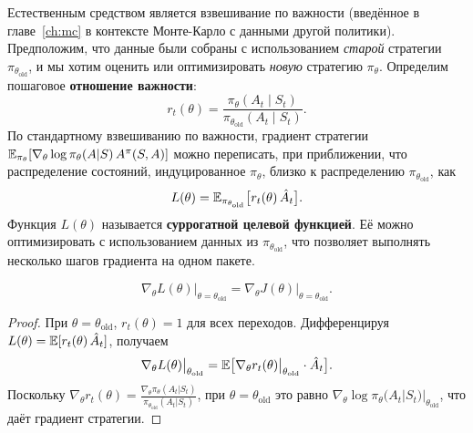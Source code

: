 Естественным средством является взвешивание по важности (введённое в главе~\ref{ch:mc} в контексте Монте-Карло с данными другой политики). Предположим, что данные были собраны с использованием \emph{старой} стратегии $\pi_{\theta_\mathrm{old}}$, и мы хотим оценить или оптимизировать \emph{новую} стратегию $\pi_\theta$. Определим пошаговое \textbf{отношение важности}:
\begin{equation}
\label{eq:importance-ratio}
r_t(\theta)
= \frac{\pi_\theta(A_t \mid S_t)}{\pi_{\theta_\mathrm{old}}(A_t \mid S_t)}.
\end{equation}
По стандартному взвешиванию по важности, градиент стратегии $\operatorname{\mathbb{E}}_{\pi_\theta}[\nabla_\theta \log\pi_\theta(A|S)\,A^\pi(S,A)]$ можно переписать, при приближении, что распределение состояний, индуцированное $\pi_\theta$, близко к распределению $\pi_{\theta_\mathrm{old}}$, как
\begin{equation}
\label{eq:surrogate-obj}
L(\theta) = \operatorname{\mathbb{E}}_{\pi_{\theta_\mathrm{old}}}\bigl[r_t(\theta)\,\hat{A}_t\bigr].
\end{equation}
Функция $L(\theta)$ называется \textbf{суррогатной целевой функцией}.
Её можно оптимизировать с использованием данных из $\pi_{\theta_\mathrm{old}}$, что позволяет выполнять несколько шагов градиента на одном пакете.

\begin{proposition}
\label{prop:surrogate-gradient}
\begin{equation}
\label{eq:surrogate-gradient}
\nabla_\theta L(\theta)\big|_{\theta = \theta_\mathrm{old}}
= \nabla_\theta J(\theta)\big|_{\theta = \theta_\mathrm{old}}.
\end{equation}
\end{proposition}

\begin{proof}
При $\theta = \theta_\mathrm{old}$, $r_t(\theta) = 1$ для всех переходов. Дифференцируя $L(\theta) = \operatorname{\mathbb{E}}[r_t(\theta)\,\hat{A}_t]$, получаем
\[
\nabla_\theta L(\theta)\big|_{\theta_\mathrm{old}}
= \operatorname{\mathbb{E}}\bigl[\nabla_\theta r_t(\theta)\big|_{\theta_\mathrm{old}}\cdot \hat{A}_t\bigr].
\]
Поскольку $\nabla_\theta r_t(\theta) = \frac{\nabla_\theta \pi_\theta(A_t|S_t)}{\pi_{\theta_\mathrm{old}}(A_t|S_t)}$, при $\theta = \theta_\mathrm{old}$ это равно $\nabla_\theta \log \pi_\theta(A_t|S_t)|_{\theta_\mathrm{old}}$, что даёт градиент стратегии.
\end{proof}

